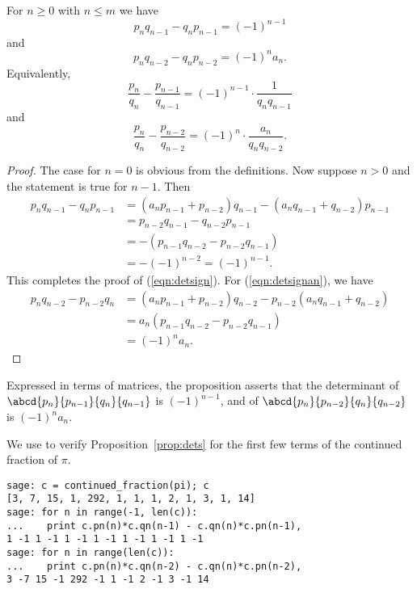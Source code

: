 \begin{proposition}\label{prop:dets}
For $n\geq 0$ with $n\leq m$ we have
\begin{equation}\label{eqn:detsign}
p_n q_{n-1} - q_n p_{n-1} = (-1)^{n-1}
\end{equation}
and
\begin{equation}\label{eqn:detsignan}
p_nq_{n-2} - q_n p_{n-2} = (-1)^n a_n.
\end{equation}
Equivalently,
$$\frac{p_n}{q_n} - \frac{p_{n-1}}{q_{n-1}} =
                  (-1)^{n-1}\cdot\frac{1}{q_n q_{n-1}}$$
and
$$\frac{p_n}{q_n} - \frac{p_{n-2}}{q_{n-2}} =
                  (-1)^{n}\cdot\frac{a_n}{q_n q_{n-2}}.$$
\end{proposition}
\begin{proof}
The case for $n=0$ is obvious from the definitions.
Now suppose $n>0$ and the statement is true for $n-1$.  Then
\begin{align*}
p_{n}q_{n-1} - q_n p_{n-1} &=
     (a_n p_{n-1} + p_{n-2}) q_{n-1} - (a_n q_{n-1} + q_{n-2}) p_{n-1}\\
  &= p_{n-2}q_{n-1} - q_{n-2} p_{n-1} \\
   &=
       -(p_{n-1}q_{n-2} - p_{n-2} q_{n-1})\\
  &= -(-1)^{n-2} = (-1)^{n-1}.
\end{align*}
This completes the proof of (\ref{eqn:detsign}).  For
(\ref{eqn:detsignan}), we have
\begin{align*}
p_n q_{n-2} - p_{n-2} q_n &=
        (a_n p_{n-1} + p_{n-2})q_{n-2} - p_{n-2}(a_n q_{n-1} + q_{n-2}) \\
       &= a_n(p_{n-1}q_{n-2} - p_{n-2}q_{n-1}) \\
       &= (-1)^n a_n.
\end{align*}
\end{proof}

\begin{remark}
Expressed in terms of matrices, the proposition asserts that the determinant
of  $\abcd{p_n}{p_{n-1}}{q_n}{q_{n-1}}$ is
$(-1)^{n-1}$, and of
$\abcd{p_n}{p_{n-2}}{q_n}{q_{n-2}}$ is  $(-1)^{n}a_n$.
\end{remark}

\begin{sg}
We use \sage to verify Proposition~\ref{prop:dets}
for the first few terms of the continued
fraction of $\pi$.
\begin{verbatim}
sage: c = continued_fraction(pi); c
[3, 7, 15, 1, 292, 1, 1, 1, 2, 1, 3, 1, 14]
sage: for n in range(-1, len(c)):
...    print c.pn(n)*c.qn(n-1) - c.qn(n)*c.pn(n-1),
1 -1 1 -1 1 -1 1 -1 1 -1 1 -1 1 -1
sage: for n in range(len(c)):
...    print c.pn(n)*c.qn(n-2) - c.qn(n)*c.pn(n-2),
3 -7 15 -1 292 -1 1 -1 2 -1 3 -1 14
\end{verbatim}
\end{sg}

